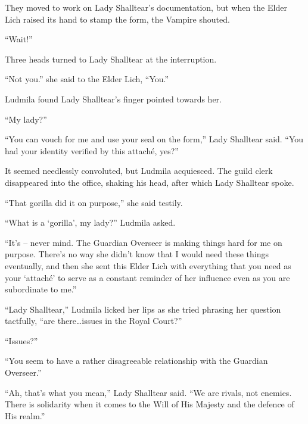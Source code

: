  

They moved to work on Lady Shalltear’s documentation, but when the Elder Lich raised its hand to stamp the form, the Vampire shouted.

 

“Wait!”

 

Three heads turned to Lady Shalltear at the interruption.

 

“Not you.” she said to the Elder Lich, “You.”

 

Ludmila found Lady Shalltear’s finger pointed towards her.

 

“My lady?”

 

“You can vouch for me and use your seal on the form,” Lady Shalltear said. “You had your identity verified by this attaché, yes?”

 

It seemed needlessly convoluted, but Ludmila acquiesced. The guild clerk disappeared into the office, shaking his head, after which Lady Shalltear spoke.

 

“That gorilla did it on purpose,” she said testily.

 

“What is a ‘gorilla’, my lady?” Ludmila asked.

 

“It’s – never mind. The Guardian Overseer is making things hard for me on purpose. There’s no way she didn’t know that I would need these things eventually, and then she sent this Elder Lich with everything that you need as your ‘attaché’ to serve as a constant reminder of her influence even as you are subordinate to me.”

 

“Lady Shalltear,” Ludmila licked her lips as she tried phrasing her question tactfully, “are there…issues in the Royal Court?”

 

“Issues?”

 

“You seem to have a rather disagreeable relationship with the Guardian Overseer.”

 

“Ah, that’s what you mean,” Lady Shalltear said. “We are rivals, not enemies. There is solidarity when it comes to the Will of His Majesty and the defence of His realm.”

